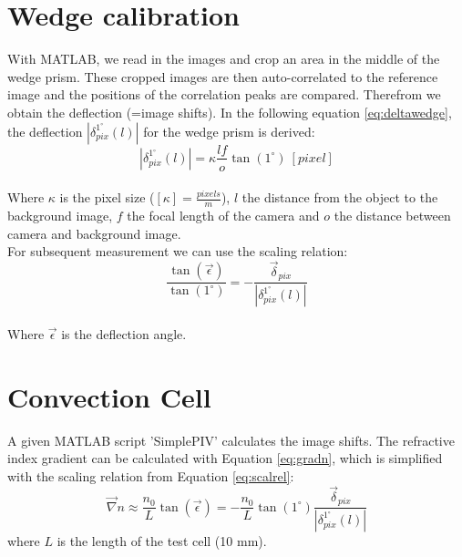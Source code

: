 \section{Wedge calibration}

With MATLAB, we read in the images and crop an area in the middle of the wedge prism. These cropped images are then auto-correlated to the reference image and the positions of the correlation peaks are compared. Therefrom we obtain the deflection (=image shifts). In the following equation \ref{eq:deltawedge}, the deflection $\left| \delta^{1^\circ}_{pix}(l) \right|$ for the wedge prism is derived:\\

\begin{equation}
\left| \delta^{1^\circ}_{pix}(l) \right|=\kappa \frac{lf}o \tan({1^\circ}) \ [pixel]
\label{eq:deltawedge}
\end{equation}\\

Where $\kappa$ is the pixel size ($[\kappa]=\frac {pixels}{m}$), $l$  the distance from the object to the background image, $f$ the focal length of the camera and $o$ the distance between camera and background image.\\

For subsequent measurement we can use the scaling relation:\\

\begin{equation}
\frac{\tan(\vec{\epsilon})} {\tan(1^\circ)} = - \frac{\vec \delta_{pix}} {\left |\delta^{1^\circ}_{pix}(l) \right |}
\label{eq:scalrel}
\end{equation}\\

Where $\vec \epsilon$ is the deflection angle. \\


\section{Convection Cell}

A given MATLAB script 'SimplePIV' calculates the image shifts. The refractive index gradient can be calculated with Equation \ref{eq:gradn}, which is simplified with the scaling relation from Equation \ref{eq:scalrel}:
\begin{equation}
\vec\nabla n \approx \frac{n_0}{L} \tan(\vec{\epsilon})=-\frac{n_0}{L}\tan(1^\circ) \frac{\vec\delta_{pix}}{|\delta_{pix}^{1^\circ}(l)|}
\label{eq:gradn}
\end{equation}
where $L$ is the length of the test cell (10 mm).\\

